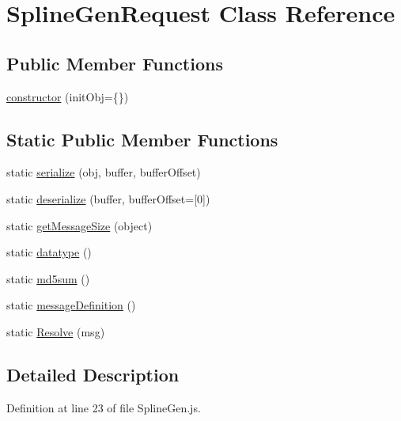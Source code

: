 \hypertarget{class_spline_gen_request}{}\section{Spline\+Gen\+Request Class Reference}
\label{class_spline_gen_request}
\subsection*{Public Member Functions}
\begin{DoxyCompactItemize}
\item 
\hyperlink{class_spline_gen_request_a3828792984edf0af02c7f07254344a5e}{constructor} (init\+Obj=\{\})
\end{DoxyCompactItemize}
\subsection*{Static Public Member Functions}
\begin{DoxyCompactItemize}
\item 
static \hyperlink{class_spline_gen_request_a1da19156c2660ea1c3f9cc9fd76e5f30}{serialize} (obj, buffer, buffer\+Offset)
\item 
static \hyperlink{class_spline_gen_request_a7577a89e56db8bdbff7b5106d198c4b1}{deserialize} (buffer, buffer\+Offset=\mbox{[}0\mbox{]})
\item 
static \hyperlink{class_spline_gen_request_a3ce69eec1d725fa5ffa2a731a9d6f2e2}{get\+Message\+Size} (object)
\item 
static \hyperlink{class_spline_gen_request_aab88aad65ab4a0b766d3c5a0294f235c}{datatype} ()
\item 
static \hyperlink{class_spline_gen_request_abe4e1c6268043932497c94f98bcbd416}{md5sum} ()
\item 
static \hyperlink{class_spline_gen_request_a08bd750abcf264f5add93e55680dde4d}{message\+Definition} ()
\item 
static \hyperlink{class_spline_gen_request_afa7061c52367b6532854825a9602f414}{Resolve} (msg)
\end{DoxyCompactItemize}


\subsection{Detailed Description}


Definition at line 23 of file Spline\+Gen.\+js.



